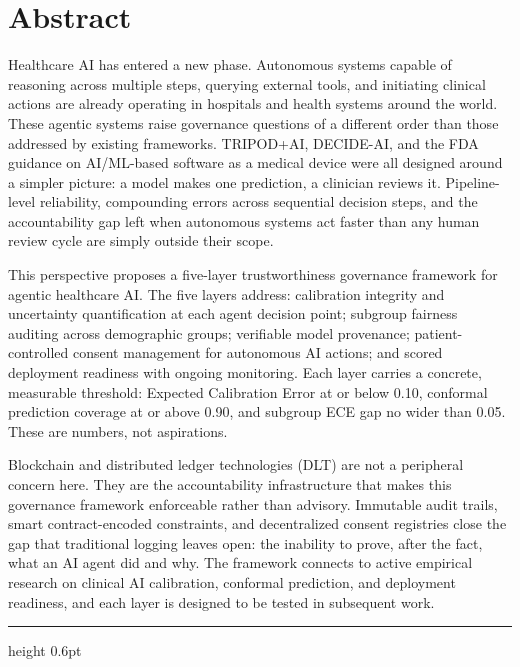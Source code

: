 \documentclass[12pt,a4paper]{article}
\begin{document}
\section*{Abstract}

Healthcare AI has entered a new phase. Autonomous systems capable
of reasoning across multiple steps, querying external tools, and
initiating clinical actions are already operating in hospitals and
health systems around the world. These agentic systems raise
governance questions of a different order than those addressed by
existing frameworks. TRIPOD+AI, DECIDE-AI, and the FDA guidance
on AI/ML-based software as a medical device were all designed
around a simpler picture: a model makes one prediction, a
clinician reviews it. Pipeline-level reliability, compounding
errors across sequential decision steps, and the accountability
gap left when autonomous systems act faster than any human review
cycle are simply outside their scope.

This perspective proposes a five-layer trustworthiness governance
framework for agentic healthcare AI. The five layers address:
calibration integrity and uncertainty quantification at each agent
decision point; subgroup fairness auditing across demographic
groups; verifiable model provenance; patient-controlled consent
management for autonomous AI actions; and scored deployment
readiness with ongoing monitoring. Each layer carries a concrete,
measurable threshold: Expected Calibration Error at or below
0.10, conformal prediction coverage at or above 0.90, and
subgroup ECE gap no wider than 0.05. These are numbers, not
aspirations.

Blockchain and distributed ledger technologies (DLT) are not a
peripheral concern here. They are the accountability
infrastructure that makes this governance framework enforceable
rather than advisory. Immutable audit trails, smart
contract-encoded constraints, and decentralized consent
registries close the gap that traditional logging leaves open:
the inability to prove, after the fact, what an AI agent did and
why. The framework connects to active empirical research on
clinical AI calibration, conformal prediction, and deployment
readiness, and each layer is designed to be tested in subsequent
work.

\vspace{8pt}
\hrule height 0.6pt
\vspace{10pt}
\end{document}
